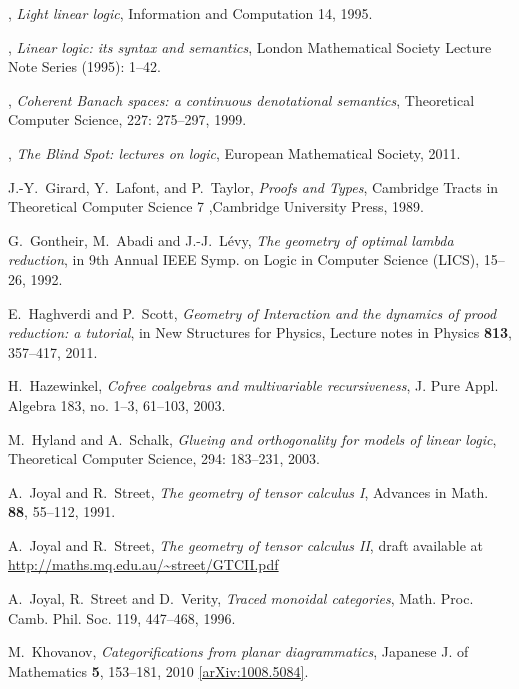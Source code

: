 \documentclass[english,letter paper,12pt,reqno]{article}
\theoremstyle{example}
\begin{document}
\begin{thebibliography}{BHLS03}
\bysame, \textsl{Light linear logic}, Information and Computation 14, 1995.

\bysame, \textsl{Linear logic: its syntax and semantics}, London Mathematical Society Lecture Note Series (1995): 1--42.

\bysame, \textsl{Coherent {B}anach spaces: a continuous denotational semantics}, Theoretical Computer Science, 227: 275--297, 1999.

\bysame, \textsl{The Blind Spot: lectures on logic}, European Mathematical Society, 2011.

J.-Y.~Girard, Y.~Lafont, and P.~Taylor, \textsl{Proofs and Types}, Cambridge Tracts in Theoretical Computer Science 7 ,Cambridge University Press, 1989.

G.~Gontheir, M.~Abadi and J.-J.~L\'{e}vy, \textsl{The geometry of optimal lambda reduction}, in 9th Annual IEEE Symp. on Logic in Computer Science (LICS), 15--26, 1992.
  
E.~Haghverdi and P.~Scott, \textsl{Geometry of {I}nteraction and the dynamics of prood reduction: a tutorial}, in New Structures for Physics, Lecture notes in Physics \textbf{813}, 357--417, 2011.
  
H.~Hazewinkel, \textsl{Cofree coalgebras and multivariable recursiveness}, J. Pure Appl. Algebra 183, no. 1--3, 61--103, 2003.

M.~Hyland and A.~Schalk, \textsl{Glueing and orthogonality for models of linear logic}, Theoretical Computer Science, 294: 183--231, 2003.

A.~Joyal and R.~Street, \textsl{The geometry of tensor calculus I}, Advances in Math. \textbf{88}, 55--112, 1991.

A.~Joyal and R.~Street, \textsl{The geometry of tensor calculus II}, 
draft available at 
\href{http://maths.mq.edu.au/~street/GTCII.pdf}{http://maths.mq.edu.au/\textasciitilde street/GTCII.pdf}

A.~Joyal, R.~Street and D.~Verity, \textsl{Traced monoidal categories}, Math. Proc. Camb. Phil. Soc. 119, 447--468, 1996.

M.~Khovanov, \textsl{Categorifications from planar diagrammatics}, Japanese J. of Mathematics \textbf{5}, 153--181, 2010 \href{http://arxiv.org/abs/1008.5084}{[arXiv:1008.5084]}.
  

\end{thebibliography}
\end{document}
